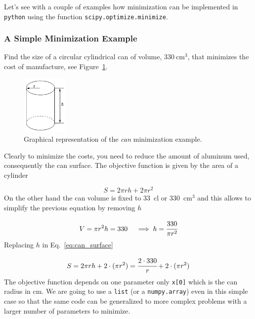 Let's see with a couple of examples how minimization can be implemented in \texttt{python} using the function \texttt{scipy.optimize.minimize}.

\subsubsection{A Simple Minimization Example}
\label{example}

Find the size of a circular cylindrical can of volume, $330~\mathrm{cm}^3$, that minimizes the cost of manufacture, see Figure~\ref{fig:cylinder}.

\begin{figure}[ht]
\centering
\includegraphics[width=0.2\textwidth]{figures/cylinder.png}
\caption{Graphical representation of the \emph{can} minimization example.}
\label{fig:cylinder}
\end{figure}

Clearly to minimize the costs, you need to reduce the amount of aluminum used, consequently the can surface. 
The objective function is given by the area of a cylinder

\begin{equation} 
S = 2\pi rh + 2\pi r^2 
\label{eq:can_surface}
\end{equation}
On the other hand the can volume is fixed to 33~cl or 330~$\mathrm{cm}^3$ and this allows to simplify the previous equation by removing $h$

\begin{equation*} 
V = \pi r^2 h = 330\quad\implies h = \cfrac{330}{\pi r^2}
\end{equation*}
Replacing $h$ in Eq.~\ref{eq:can_surface} 

\begin{equation}
S = 2\pi rh + 2\cdot(\pi r^2) = \cfrac{2\cdot 330}{r} + 2\cdot(\pi r^2)
\end{equation}
The objective function depends on one parameter only \texttt{x[0]} which is the can radius in cm. We are going to use a \texttt{list} (or a \texttt{numpy.array}) even in this simple case so that the same code can be generalized to more complex problems with a larger number of parameters to minimize. 

